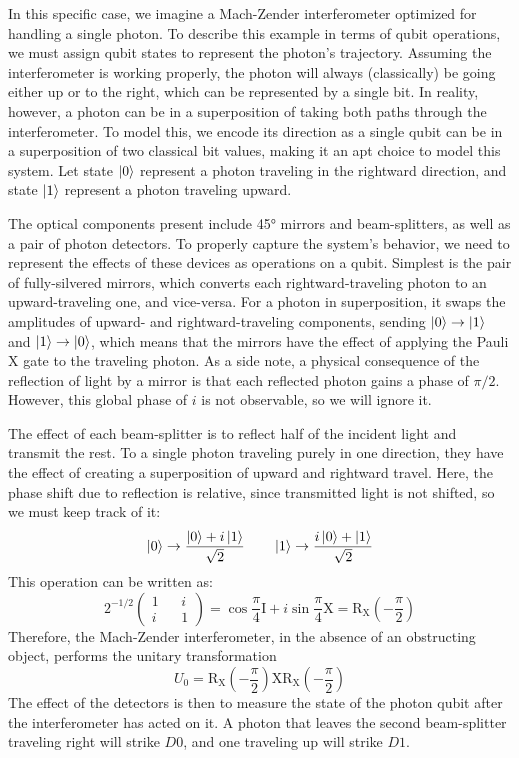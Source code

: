 \documentclass{article}
\newcommand{\I}{\text{I}}
\newcommand{\X}{\text{X}}
\newcommand{\RX}{\mathrm{R_X}}
\begin{document}
In this specific case, we imagine a Mach-Zender interferometer optimized for handling a single photon. To describe this example in terms of qubit operations, we must assign qubit states to represent the photon's trajectory. Assuming the interferometer is working properly, the photon will always (classically) be going either up or to the right, which can be represented by a single bit. In reality, however, a photon can be in a superposition of taking both paths through the interferometer. To model this, we encode its direction as a single qubit can be in a superposition of two classical bit values, making it an apt choice to model this system. Let state $\ket 0$ represent a photon traveling in the rightward direction, and state $\ket 1$ represent a photon traveling upward.

The optical components present include 45° mirrors and beam-splitters, as well as a pair of photon detectors. To properly capture the system's behavior, we need to represent the effects of these devices as operations on a qubit. Simplest is the pair of fully-silvered mirrors, which converts each rightward-traveling photon to an upward-traveling one, and vice-versa. For a photon in superposition, it swaps the amplitudes of upward- and rightward-traveling components, sending $\ket 0 \to \ket 1$ and $\ket 1 \to \ket 0$, which means that the mirrors have the effect of applying the Pauli $\X$ gate to the traveling photon. As a side note, a physical consequence of the reflection of light by a mirror is that each reflected photon gains a phase of $\pi/2$. However, this global phase of $i$ is not observable, so we will ignore it.

The effect of each beam-splitter is to reflect half of the incident light and transmit the rest. To a single photon traveling purely in one direction, they have the effect of creating a superposition of upward and rightward travel. Here, the phase shift due to reflection is relative, since transmitted light is not shifted, so we must keep track of it:
$$\ket 0 \to \frac{\ket 0 + i\ket 1}{\sqrt{2}} \qquad \ket 1 \to \frac{i\ket 0 + \ket 1}{\sqrt{2}}$$
This operation can be written as:
$$2^{-1/2}\begin{pmatrix}1 && i \\ i && 1\end{pmatrix} = \cos\frac{\pi}{4}\I + i\sin\frac{\pi}{4}\X = \RX\left(-\frac{\pi}{2}\right)$$
Therefore, the Mach-Zender interferometer, in the absence of an obstructing object, performs the unitary transformation
$$U_0 = \RX\left(-\frac{\pi}{2}\right)\X\RX\left(-\frac{\pi}{2}\right)$$
The effect of the detectors is then to measure the state of the photon qubit after the interferometer has acted on it. A photon that leaves the second beam-splitter traveling right will strike $D0$, and one traveling up will strike $D1$.
\end{document}
